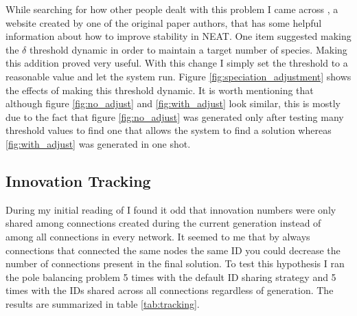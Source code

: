 \documentclass[twocolumn,letterpaper]{article}
\begin{document}
While searching for how other people dealt with this problem I came across \cite{neat_web}, a website created
by one of the original paper authors, that has some helpful information about how to improve stability in
NEAT. One item suggested making the $\delta$ threshold dynamic in order to maintain a target number of
species. Making this addition proved very useful. With this change I simply set the threshold to 
a reasonable value and let the system run. Figure \ref{fig:speciation_adjustment} shows the effects of
making this threshold dynamic. It is worth mentioning that although figure \ref{fig:no_adjust} and 
\ref{fig:with_adjust} look similar, this is mostly due to the fact that figure \ref{fig:no_adjust} was
generated only after testing many threshold values to find one that allows the system to find a solution
whereas \ref{fig:with_adjust} was generated in one shot.
 
\subsection{Innovation Tracking} \label{sec:innovations}
During my initial reading of \cite{neat_paper} I found it odd that innovation numbers were only shared among
connections created during the current generation instead of among all connections in every network. It seemed to me that by always connections that connected the same nodes the same ID you could decrease the
number of connections present in the final solution. To test this hypothesis I ran the pole balancing problem
5 times with the default ID sharing strategy and 5 times with the IDs shared across all connections 
regardless of generation. The results are summarized in table \ref{tab:tracking}.

\begin{table}[]
	\centering
	\caption{Effects of sharing IDs within each generation compared to each run.}
	\label{tab:tracking}
\end{table}
\end{document}
